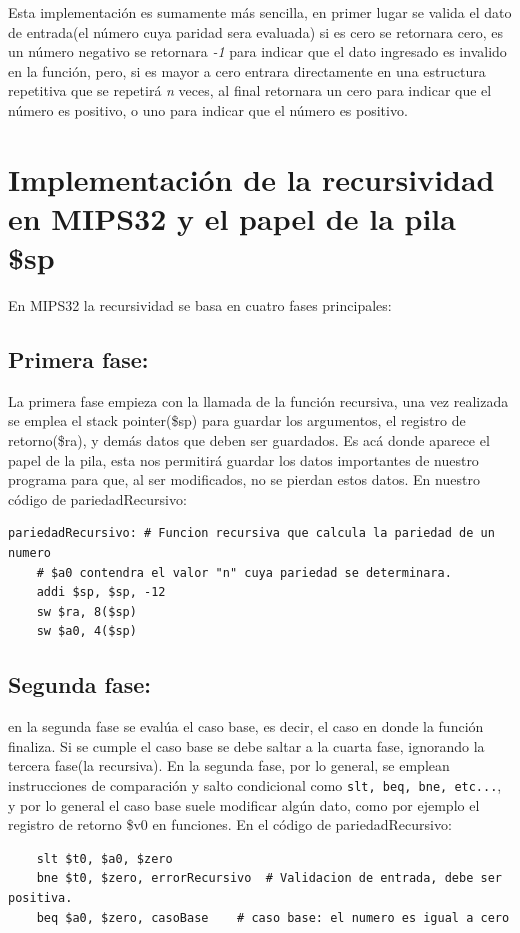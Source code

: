 \documentclass[12pt, a4paper]{article}
\begin{document}
Esta implementación es sumamente más sencilla, en primer lugar se valida el dato de entrada(el número cuya paridad sera evaluada) si es cero se retornara cero, es un número negativo se retornara \textit{-1} para indicar que el dato ingresado es invalido en la función, pero, si es mayor a cero entrara directamente en una estructura repetitiva que se repetirá \textit{n} veces, al final retornara un cero para indicar que el número es positivo, o uno para indicar que el número es positivo.

\section{Implementación de la recursividad en MIPS32 y el papel de la pila \$sp}
En MIPS32 la recursividad se basa en cuatro fases principales:

\subsection{Primera fase:} La primera fase empieza con la llamada de la función recursiva, una vez realizada se emplea el stack pointer(\$sp) para guardar los argumentos, el registro de retorno(\$ra), y demás datos que deben ser guardados. Es acá donde aparece el papel de la pila, esta nos permitirá guardar los datos importantes de nuestro programa para que, al ser modificados, no se pierdan estos datos. En nuestro código de pariedadRecursivo:

\newpage

\begin{lstlisting}
pariedadRecursivo: # Funcion recursiva que calcula la pariedad de un numero
	# $a0 contendra el valor "n" cuya pariedad se determinara.
	addi $sp, $sp, -12
	sw $ra, 8($sp)
	sw $a0, 4($sp)
\end{lstlisting}
\subsection{Segunda fase:} en la segunda fase se evalúa el caso base, es decir, el caso en donde la función finaliza. Si se cumple el caso base se debe saltar a la cuarta fase, ignorando la tercera fase(la recursiva). En la segunda fase, por lo general, se emplean instrucciones de comparación y salto condicional como \lstinline|slt, beq, bne, etc...|, y por lo general el caso base suele modificar algún dato, como por ejemplo el registro de retorno \$v0 en funciones. En el código de pariedadRecursivo:
\begin{lstlisting}
	slt $t0, $a0, $zero
	bne $t0, $zero, errorRecursivo	# Validacion de entrada, debe ser positiva.
	beq $a0, $zero, casoBase	# caso base: el numero es igual a cero
\end{lstlisting}
\end{document}
